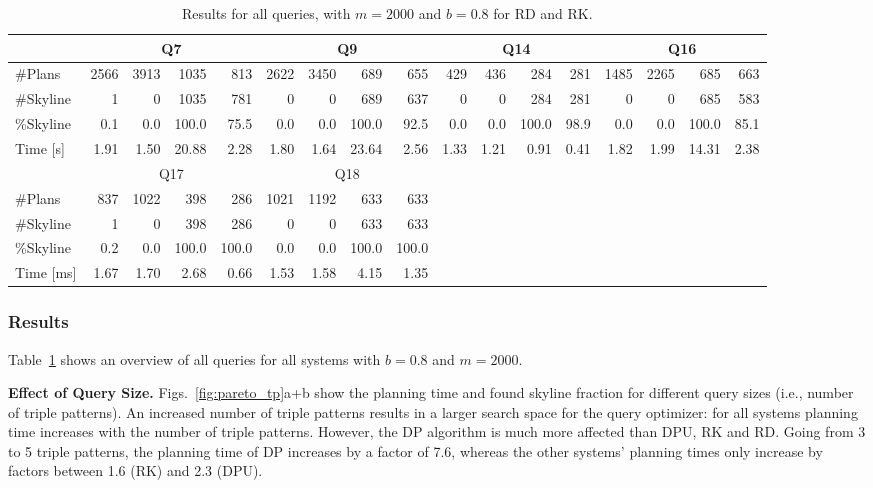 \begin{table}[htb]
\begin{tabular}{l|r|r|r|r|r|r|r|r|r|r|r|r|r|r|r|r}
 & \multicolumn{4}{c}{Q7} & \multicolumn{4}{|c|}{Q9} & \multicolumn{4}{c|}{Q14} & \multicolumn{4}{c}{Q16} \\

    \hline

    \#Plans   & 2566 & 3913 & 1035  & 813  & 2622 & 3450 & 689   & 655  & 429  & 436  & 284   & 281  & 1485 & 2265 & 685   & 663  \\
    \#Skyline & 1    & 0    & 1035  & 781  & 0    & 0    & 689   & 637  & 0    & 0    & 284   & 281  & 0    & 0    & 685   & 583  \\ 
    \%Skyline & 0.1  & 0.0  & 100.0 & 75.5 & 0.0  & 0.0  & 100.0 & 92.5 & 0.0  & 0.0  & 100.0 & 98.9 & 0.0  & 0.0  & 100.0 & 85.1 \\
    Time [s]  & 1.91 & 1.50 & 20.88 & 2.28 & 1.80 & 1.64 & 23.64 & 2.56 & 1.33 & 1.21 & 0.91  & 0.41 & 1.82 & 1.99 & 14.31 & 2.38 \\

    \hline
    \hline

 & \multicolumn{4}{c}{Q17} & \multicolumn{4}{|c|}{Q18} & \multicolumn{8}{c}{} \\

    \hline

    \#Plans   & 837  & 1022 & 398   & 286   & 1021 & 1192 & 633   & 633   & \multicolumn{8}{c}{} \\
    \#Skyline & 1    & 0    & 398   & 286   & 0    & 0    & 633   & 633   & \multicolumn{8}{c}{} \\ 
    \%Skyline & 0.2  & 0.0  & 100.0 & 100.0 & 0.0  & 0.0  & 100.0 & 100.0 & \multicolumn{8}{c}{} \\
    Time [ms] & 1.67 & 1.70 & 2.68  & 0.66  & 1.53 & 1.58 & 4.15  & 1.35  & \multicolumn{8}{c}{} \\

  \end{tabular}
  \caption{Results for all queries, with $m=2000$ and $b=0.8$ for RD and RK.}
  \label{tab:res}
\end{table}

\subsubsection{Results}

Table~\ref{tab:res} shows an overview of all queries for all systems
with $b=0.8$ and $m=2000$. 

\textbf{Effect of Query Size.} Figs.~\ref{fig:pareto_tp}a+b show the
planning time and found skyline fraction for different query sizes
(i.e., number of triple patterns). An increased number of triple
patterns results in a larger search space for the query optimizer: for
all systems planning time increases with the number of triple
patterns. However, the DP algorithm is much more affected than DPU, RK
and RD. Going from 3 to 5 triple patterns, the planning time of DP
increases by a factor of 7.6, whereas the other systems' planning
times only increase by factors between 1.6 (RK) and 2.3 (DPU). 

